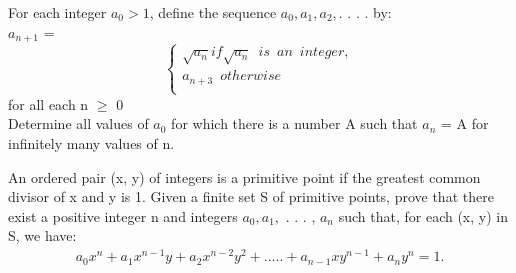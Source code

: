
\item For each integer $a_0 > 1$, define the sequence $a_0, a_1, a_2,$. . . .  by:\\
$a_{n+1}$ = \[ \begin{cases} 
      \sqrt{a_n} if \sqrt{a_n} \enspace is \enspace an \enspace integer, \\
      a_{n+3}\enspace otherwise \\
       
   \end{cases}
\]
for all each n $\geq$ 0\\
Determine all values of $a_0$ for which there is a number A such that $a_n$ = A for infinitely many values of n.
\item An ordered pair (x, y) of integers is a primitive point if the greatest common divisor
of x and y is 1. Given a finite set S of primitive points, prove that there exist a positive integer n and integers $a_0, a_1,$ . . . , $a_n$ such that, for each (x, y) in S, we have:
\begin{align*}
a_0 x^n + a_1 x^{n - 1}y + a_2 x^{n - 2}y^2 +. . . . . + a_{n-1}xy^{n-1} + a_n y^n = 1.
\end{align*}

